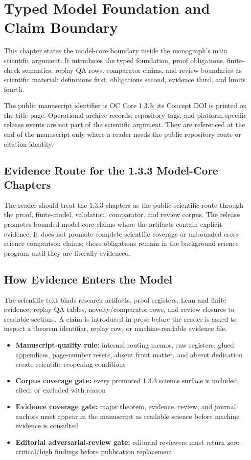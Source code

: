 \section{Typed Model Foundation and Claim Boundary}
\label{sec:oc133-integrated-scientific-closure}
This chapter states the model-core boundary inside the monograph's main scientific argument. It introduces the typed foundation, proof obligations, finite-check semantics, replay QA rows, comparator claims, and review boundaries as scientific material: definitions first, obligations second, evidence third, and limits fourth.

The public manuscript identifier is OC Core 1.3.3; its Concept DOI is printed on the title page. Operational archive records, repository tags, and platform-specific release events are not part of the scientific argument. They are referenced at the end of the manuscript only where a reader needs the public repository route or citation identity.

\subsection{Evidence Route for the 1.3.3 Model-Core Chapters}
The reader should treat the 1.3.3 chapters as the public scientific route through the proof, finite-model, validation, comparator, and review corpus. The release promotes bounded model-core claims where the artifacts contain explicit evidence. It does not promote complete scientific coverage or unbounded cross-science comparison claims; those obligations remain in the background science program until they are literally evidenced.

\subsection{How Evidence Enters the Model}
The scientific text binds research artifacts, proof registers, Lean and finite evidence, replay QA tables, novelty/comparator rows, and review closures to readable sections. A claim is introduced in prose before the reader is asked to inspect a theorem identifier, replay row, or machine-readable evidence file.

\begin{itemize}[leftmargin=1.8em]
\item \textbf{Manuscript-quality rule:} internal routing memos, raw registers, glued appendices, page-number resets, absent front matter, and absent dedication create scientific reopening conditions
\item \textbf{Corpus coverage gate:} every promoted 1.3.3 science surface is included, cited, or excluded with reason
\item \textbf{Evidence coverage gate:} major theorem, evidence, review, and journal anchors must appear in the manuscript as readable science before machine evidence is consulted
\item \textbf{Editorial adversarial-review gate:} editorial reviewers must return zero critical/high findings before publication replacement
\end{itemize}
